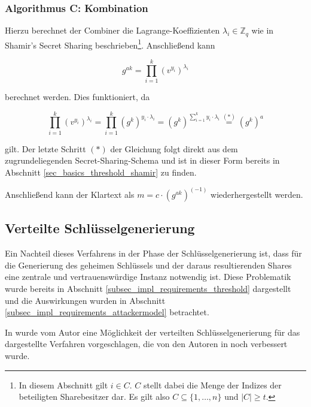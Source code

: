 \subsubsection*{Algorithmus C: Kombination}

Hierzu berechnet der Combiner die Lagrange-Koeffizienten \(\lambda_i \in \mathbb{Z}_q\) wie in Shamir's Secret Sharing beschrieben\footnote{
  In diesem Abschnitt gilt \(i \in C\). \(C\) stellt dabei die Menge der Indizes der beteiligten Sharebesitzer dar. Es gilt also \(C \subseteq \{1, \dots, n\}\) und \(| C | \ge t\).
}. Anschließend kann
 
\[g^{ak} = \prod_{i=1}^k (v^{y_i})^{\lambda_i}\]

berechnet werden. Dies funktioniert, da 

\[
\prod_{i=1}^k (v^{y_i})^{\lambda_i} = 
\prod_{i=1}^k (g^k)^{y_i \cdot \lambda_i} = 
(g^k)^{\sum_{i=1}^{k} y_i \cdot \lambda_i} \overset{(*)}{=}
(g^k)^a
\]

gilt. Der letzte Schritt \((*)\) der Gleichung folgt direkt aus dem zugrundeliegenden Secret-Sharing-Schema und ist in dieser Form bereits in Abschnitt \ref{sec_basics_threshold_shamir} zu finden.

Anschließend kann der Klartext als \(m = c \cdot (g^{ak})^{(-1)}\) wiederhergestellt werden. 

\subsection{Verteilte Schlüsselgenerierung}

\label{sec_state_threshold_distributed}

Ein Nachteil dieses Verfahrens in der Phase der Schlüsselgenerierung ist, dass für die Generierung des geheimen Schlüssels und der daraus resultierenden Shares eine zentrale und vertrauenswürdige Instanz notwendig ist. Diese Problematik wurde bereits in Abschnitt \ref{subsec_impl_requirements_threshold} dargestellt und die Auswirkungen wurden in Abschnitt \ref{subsec_impl_requirements_attackermodel} betrachtet.

In \cite{pedersen1991} wurde vom Autor eine Möglichkeit der verteilten Schlüsselgenerierung für das dargestellte Verfahren vorgeschlagen, die von den Autoren in \cite{gennaro1999} noch verbessert wurde. 

